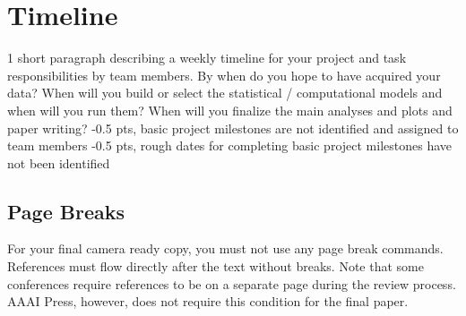 \documentclass[letterpaper]{article} %
\begin{document}
\section{Timeline}
1 short paragraph describing a weekly timeline for your project and task responsibilities by team members. By when do you hope to have acquired your data? When will you build or select the statistical / computational models and when will you run them? When will you finalize the main analyses and plots and paper writing? 
-0.5 pts, basic project milestones are not identified and assigned to team members
-0.5 pts, rough dates for completing basic project milestones have not been identified




\subsection{Page Breaks}
For your final camera ready copy, you must not use any page break commands. References must flow directly after the text without breaks. Note that some conferences require references to be on a separate page during the review process. AAAI Press, however, does not require this condition for the final paper.


\end{document}
